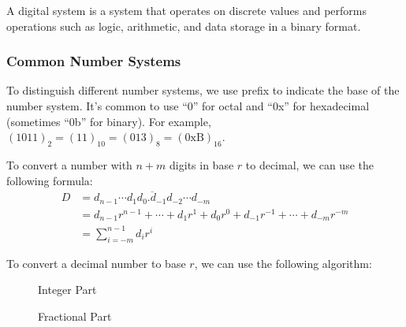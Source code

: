 \documentclass[a4paper,12pt]{article}
\begin{document}
A digital system is a system that operates on discrete values and performs operations such as logic, arithmetic, and data storage in a binary format.

\subsubsection{Common Number Systems}

To distinguish different number systems, we use prefix to indicate the base of the number system.
It's common to use ``0'' for octal and ``0x'' for hexadecimal (sometimes ``0b'' for binary).
For example, $(1011)_2 = (11)_{10} = (013)_8 = (0\text{xB})_{16}$.

To convert a number with $n + m$ digits in base $r$ to decimal, we can use the following formula:
\begin{align*}
	D &= \overline{d_{n-1} \cdots d_1 d_0. d_{-1} d_{-2} \cdots d_{-m}} \\
	&= d_{n-1} r^{n-1} + \cdots + d_1 r^1 + d_0 r^0 + d_{-1} r^{-1} + \cdots + d_{-m} r^{-m} \\
	&= \sum_{i=-m}^{n-1} d_i r^i
\end{align*}

\newpage
To convert a decimal number to base $r$, we can use the following algorithm:
\begin{figure}[H]
	\begin{minipage}{0.5\textwidth}
		\centering
		\caption*{Integer Part}
	\end{minipage}
	\begin{minipage}{0.5\textwidth}
		\centering
		\caption*{Fractional Part}
	\end{minipage}
\end{figure}
\end{document}
